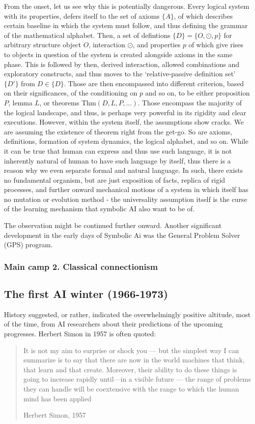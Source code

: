 From the onset, let us see why this is potentially dangerous. Every logical system with its properties, defers itself to the set of axioms $\{A\}$, of which describes certain baseline in which the system must follow, and thus defining the grammar of the mathematical alphabet. Then, a set of defintions $\{D\}=\{O,\odot, p\}$ for arbitrary structure object $O$, interaction $\odot$, and properties $p$ of which give rises to objects in question of the system is created alongside axioms in the same phase. This is followed by then, derived interaction, allowed combinations and exploratory constructs, and thus moves to the `relative-passive definition set' $\{D'\}$ from $D\in\{D\}$. Those are then encompassed into different criterion, based on their significances, of the conditioning on $p$ and so on, to be either proposition $P$, lemma $L$, or theorems $\mathrm{Thm}(D,L,P,\dots)$. Those encompass the majority of the logical landscape, and thus, is perhaps very powerful in its rigidity and clear executions. However, within the system itself, the assumptions show cracks. We are assuming the existence of theorem right from the get-go. So are axioms, definitions, formation of system dynamics, the logical alphabet, and so on. While it can be true that human can express and thus use such language, it is not inherently natural of human to have such language by itself, thus there is a reason why we even separate formal and natural language. In such, there exists no fundamental organism, but are just exposition of facts, replica of rigid processes, and further onward mechanical motions of a system in which itself has no mutation or evolution method - the universality assumption itself is the curse of the learning mechanism that symbolic AI also want to be of. 

The observation might be continued further onward. Another significant development in the early days of Symbolic Ai was the General Problem Solver (GPS) program. 

\subsubsection{Main camp 2. Classical connectionism}

\subsection{The first AI winter (1966-1973)}

History suggested, or rather, indicated the overwhelmingly positive altitude, most of the time, from AI researchers about their predictions of the upcoming progresses. Herbert Simon in 1957 is often quoted: 
\blockquote[Herbert Simon, 1957]{It is not my aim to surprise or shock you --- but the simplest way I can summarize is to say that there are now in the world machines that think, that learn and that create. Moreover, their ability to do these things is going to increase rapidly until—in a visible future --- the range of problems they can handle will be coextensive with the range to which the human mind has been applied}

